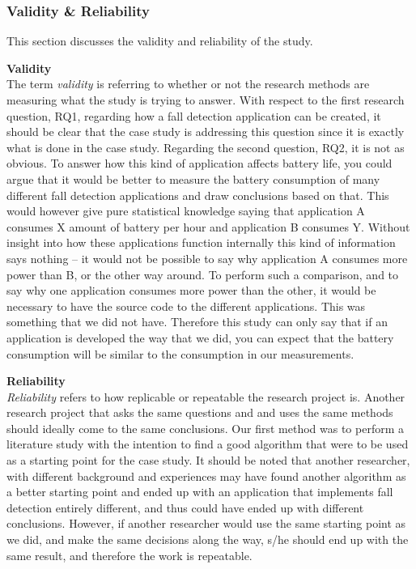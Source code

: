 \documentclass[12pt, a4paper, onecolumn]{article}
\newcommand{\parag}[1]{
	\textbf{#1} \hspace{0pt} \\
}
\begin{document}
	\subsubsection{Validity \& Reliability}
	
	This section discusses the validity and reliability of the study.
	
	\parag{Validity}
	The term \textit{validity} is referring to whether or not the research methods are measuring what the study is trying to answer. With respect to the first research question, RQ1, regarding how a fall detection application can be created, it should be clear that the case study is addressing this question since it is exactly what is done in the case study. Regarding the second question, RQ2, it is not as obvious. To answer how this kind of application affects battery life, you could argue that it would be better to measure the battery consumption of many different fall detection applications and draw conclusions based on that. This would however give pure statistical knowledge saying that application A consumes X amount of battery per hour and application B consumes Y. Without insight into how these applications function internally this kind of information says nothing -- it would not be possible to say why application A consumes more power than B, or the other way around. To perform such a comparison, and to say why one application consumes more power than the other, it would be necessary to have the source code to the different applications. This was something that we did not have. Therefore this study can only say that if an application is developed the way that we did, you can expect that the battery consumption will be similar to the consumption in our measurements.
	
	\parag{Reliability}
	\textit{Reliability} refers to how replicable or repeatable the research project is. Another research project that asks the same questions and and uses the same methods should ideally come to the same conclusions. Our first method was to perform a literature study with the intention to find a good algorithm that were to be used as a starting point for the case study. It should be noted that another researcher, with different background and experiences may have found another algorithm as a better starting point and ended up with an application that implements fall detection entirely different, and thus could have ended up with different conclusions. However, if another researcher would use the same starting point as we did, and make the same decisions along the way, s/he should end up with the same result, and therefore the work is repeatable.
	
\end{document}
